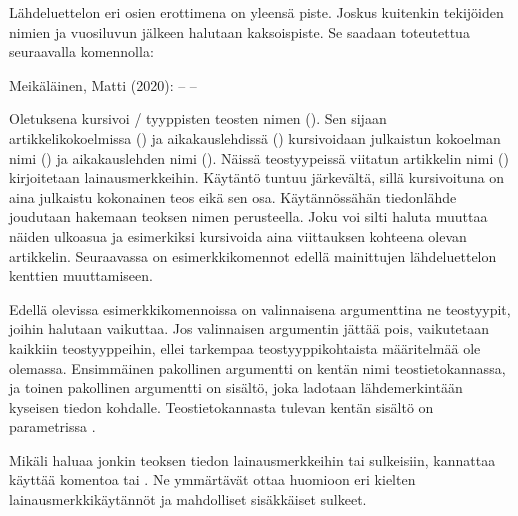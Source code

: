 Lähdeluettelon eri osien erottimena on yleensä piste. Joskus kuitenkin
tekijöiden nimien ja vuosiluvun jälkeen halutaan kaksoispiste. Se
saadaan toteutettua seuraavalla komennolla:

\begin{koodilohkosis}
\end{koodilohkosis}

\begin{tulossis}
  Meikäläinen, Matti (2020): -- --
\end{tulossis}

Oletuksena  kursivoi \-/ tyyppisten
teosten nimen (). Sen sijaan artikkelikokoelmissa
() ja aikakauslehdissä ()
kursivoidaan julkaistun kokoelman nimi () ja
aikakauslehden nimi (). Näissä teostyypeissä
viitatun artikkelin nimi () kirjoitetaan lainausmerkkeihin.
Käytäntö tuntuu järkevältä, sillä kursivoituna on aina julkaistu
kokonainen teos eikä sen osa. Käytännössähän tiedonlähde joudutaan
hakemaan teoksen nimen perusteella. Joku voi silti haluta muuttaa näiden
ulkoasua ja esimerkiksi kursivoida aina viittauksen kohteena olevan
artikkelin. Seuraavassa on esimerkkikomennot edellä mainittujen
lähdeluettelon kenttien muuttamiseen.

\begin{koodilohkosis}
\end{koodilohkosis}

Edellä olevissa esimerkkikomennoissa on valinnaisena argumenttina ne
teostyypit, joihin halutaan vaikuttaa. Jos valinnaisen argumentin jättää
pois, vaikutetaan kaikkiin teostyyppeihin, ellei tarkempaa
teostyyppikohtaista määritelmää ole olemassa. Ensimmäinen pakollinen
argumentti on kentän nimi teostietokannassa, ja toinen pakollinen
argumentti on sisältö, joka ladotaan lähdemerkintään kyseisen tiedon
kohdalle. Teostietokannasta tulevan kentän sisältö on parametrissa
.

Mikäli haluaa jonkin teoksen tiedon lainausmerkkeihin tai sulkeisiin,
kannattaa käyttää komentoa  tai
. Ne ymmärtävät ottaa huomioon eri kielten
lainausmerkkikäytännöt ja mahdolliset sisäkkäiset sulkeet.

